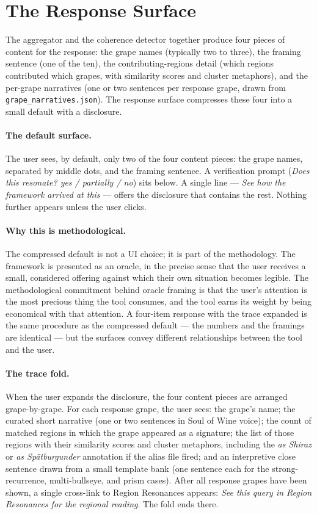 \documentclass[11pt]{article}
\begin{document}
\section{The Response Surface}

The aggregator and the coherence detector together produce four pieces of content for the response: the grape names (typically two to three), the framing sentence (one of the ten), the contributing-regions detail (which regions contributed which grapes, with similarity scores and cluster metaphors), and the per-grape narratives (one or two sentences per response grape, drawn from \texttt{grape\_narratives.json}). The response surface compresses these four into a small default with a disclosure.

\paragraph{The default surface.}
The user sees, by default, only two of the four content pieces: the grape names, separated by middle dots, and the framing sentence. A verification prompt (\emph{Does this resonate? yes / partially / no}) sits below. A single line --- \emph{See how the framework arrived at this} --- offers the disclosure that contains the rest. Nothing further appears unless the user clicks.

\paragraph{Why this is methodological.}
The compressed default is not a UI choice; it is part of the methodology. The framework is presented as an oracle, in the precise sense that the user receives a small, considered offering against which their own situation becomes legible. The methodological commitment behind oracle framing is that the user's attention is the most precious thing the tool consumes, and the tool earns its weight by being economical with that attention. A four-item response with the trace expanded is the same procedure as the compressed default --- the numbers and the framings are identical --- but the surfaces convey different relationships between the tool and the user.

\paragraph{The trace fold.}
When the user expands the disclosure, the four content pieces are arranged grape-by-grape. For each response grape, the user sees: the grape's name; the curated short narrative (one or two sentences in Soul of Wine voice); the count of matched regions in which the grape appeared as a signature; the list of those regions with their similarity scores and cluster metaphors, including the \emph{as Shiraz} or \emph{as Spätburgunder} annotation if the alias file fired; and an interpretive close sentence drawn from a small template bank (one sentence each for the strong-recurrence, multi-bullseye, and prism cases). After all response grapes have been shown, a single cross-link to Region Resonances appears: \emph{See this query in Region Resonances for the regional reading}. The fold ends there.
\end{document}
